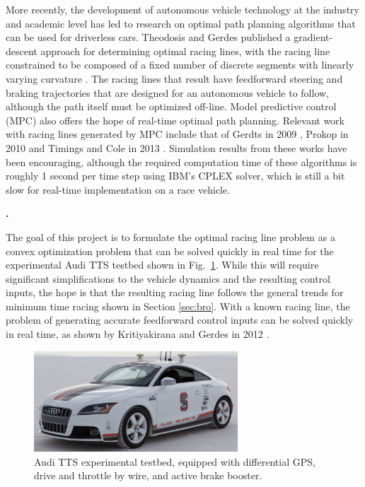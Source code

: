 \documentclass[10pt,a4paper]{article}
\def\section#1{\refstepcounter{section} \vspace{3.5mm} \noindent
{\normalsize\bf {\thesection.}} \hspace{0.5mm}{\normalsize\bf #1} \par \vspace{2mm}}
\begin{document}
More recently, the development of autonomous vehicle technology at the industry and academic level has led to research on optimal path planning algorithms that can be used for
driverless cars. Theodosis and Gerdes published a gradient-descent approach for determining optimal racing lines, with the racing line constrained to be composed of a fixed number of discrete
segments with linearly varying curvature \cite{theodosis}. The racing lines that result have feedforward steering and braking trajectories that are designed for an autonomous vehicle to follow, although
the path itself must be optimized off-line. Model predictive control (MPC) also offers the hope of real-time optimal path planning. Relevant work with racing lines generated by MPC include that of Gerdts in 2009 \cite{gerdts}, Prokop in 2010 \cite{prokop} and Timings and Cole in 2013 \cite{timings}.
Simulation results from these works have been encouraging, although the required computation time of these algorithms is roughly 1 second per time step using IBM's CPLEX solver, which is still a bit slow for real-time 
implementation on a race vehicle.


\section{PROJECT GOAL}

The goal of this project is to formulate the optimal racing line problem as a convex optimization problem that can be solved quickly in real time for the experimental Audi TTS testbed
shown in Fig.~\ref{fig:shelleyPic}. While this will require significant simplifications to the vehicle dynamics and the resulting control inputs, the hope is that the 
resulting racing line follows the general trends for minimum time racing shown in Section \ref{sec:bro}. With a known racing line, 
the problem of generating accurate feedforward control inputs can be solved quickly in real time,
 as shown by Kritiyakirana and Gerdes in 2012 \cite{mickgeneral}.

\begin{figure}[h]
\centering
\includegraphics[width=3in]{figures/shelleyPic.png}
\caption{Audi TTS experimental testbed, equipped with differential GPS, drive and throttle by wire, and active brake booster.}
\label{fig:shelleyPic}
\end{figure}
\end{document}
